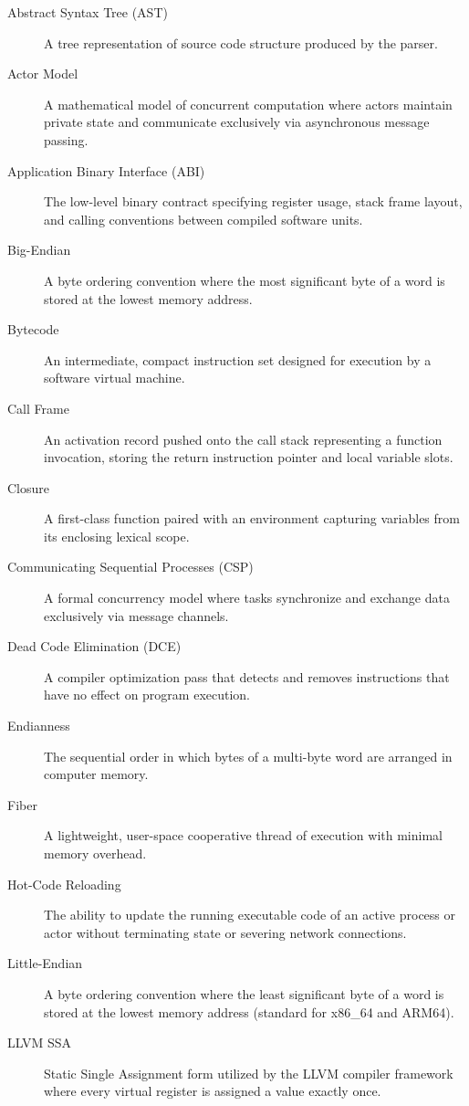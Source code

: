 \begin{description}
    \item[Abstract Syntax Tree (AST)] A tree representation of source code structure produced by the parser.
    \item[Actor Model] A mathematical model of concurrent computation where actors maintain private state and communicate exclusively via asynchronous message passing.
    \item[Application Binary Interface (ABI)] The low-level binary contract specifying register usage, stack frame layout, and calling conventions between compiled software units.
    \item[Big-Endian] A byte ordering convention where the most significant byte of a word is stored at the lowest memory address.
    \item[Bytecode] An intermediate, compact instruction set designed for execution by a software virtual machine.
    \item[Call Frame] An activation record pushed onto the call stack representing a function invocation, storing the return instruction pointer and local variable slots.
    \item[Closure] A first-class function paired with an environment capturing variables from its enclosing lexical scope.
    \item[Communicating Sequential Processes (CSP)] A formal concurrency model where tasks synchronize and exchange data exclusively via message channels.
    \item[Dead Code Elimination (DCE)] A compiler optimization pass that detects and removes instructions that have no effect on program execution.
    \item[Endianness] The sequential order in which bytes of a multi-byte word are arranged in computer memory.
    \item[Fiber] A lightweight, user-space cooperative thread of execution with minimal memory overhead.
    \item[Hot-Code Reloading] The ability to update the running executable code of an active process or actor without terminating state or severing network connections.
    \item[Little-Endian] A byte ordering convention where the least significant byte of a word is stored at the lowest memory address (standard for x86\_64 and ARM64).
    \item[LLVM SSA] Static Single Assignment form utilized by the LLVM compiler framework where every virtual register is assigned a value exactly once.

\end{description}
